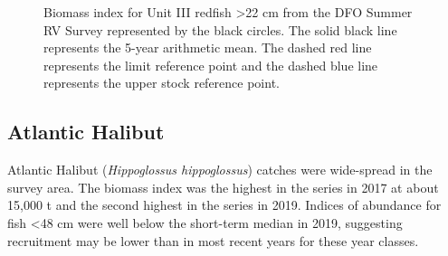 \documentclass[11pt]{book}
\begin{document}
\begin{figure}[htb]

{\centering {} 

}

\caption{Biomass index for Unit III redfish \textgreater22 cm from the DFO Summer RV Survey represented by the black circles. The solid black line represents the 5-year arithmetic mean. The dashed red line represents the limit reference point and the dashed blue line represents the upper stock reference point.}\label{fig:41-fig-redfish-biomassUnitIII-22cm}
\end{figure}
\clearpage

\hypertarget{atlantic-halibut}{%
\subsection{Atlantic Halibut}\label{atlantic-halibut}}

Atlantic Halibut (\emph{Hippoglossus hippoglossus}) catches were wide-spread in the survey area. The biomass index was the highest in the series in 2017 at about 15,000 t and the second highest in the series in 2019. Indices of abundance for fish \textless48 cm were well below the short-term median in 2019, suggesting recruitment may be lower than in most recent years for these year classes.
\end{document}
